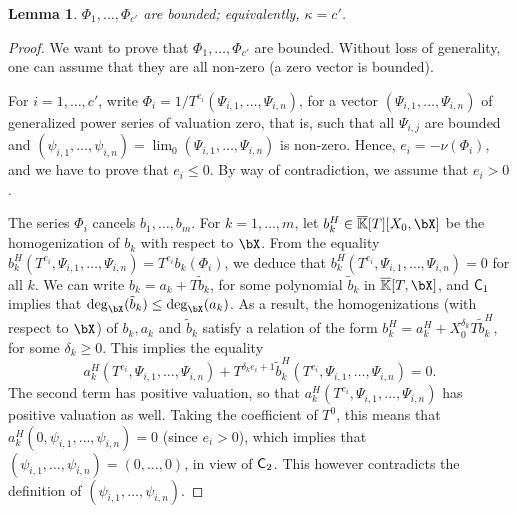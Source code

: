 \documentclass[12pt]{article}
\newtheorem{lemma}[definition]{Lemma}
\begin{document}
\begin{lemma}
   $\Phi_1,\dots,\Phi_{c'}$ are bounded; equivalently, $\kappa=c'$.
\end{lemma}
\begin{proof}
  We want to prove that $\Phi_1,\dots,\Phi_{c'}$ are bounded. Without
  loss of generality, one can assume that they are all non-zero (a
  zero vector is bounded).

  For $i=1,\dots,c'$, write
  $\Phi_i=1/T^{e_i} (\Psi_{i,1},\dots,\Psi_{i,n})$, for a vector
  $(\Psi_{i,1},\dots,\Psi_{i,n})$ of generalized power  series of valuation zero,
  that is, such that all $\Psi_{i,j}$ are bounded and
  $(\psi_{i,1},\dots,\psi_{i,n})=\lim_0(\Psi_{i,1},\dots,\Psi_{i,n})$
  is non-zero. Hence, $e_i=-\nu(\Phi_i)$, and we have to prove that
  $e_i \le 0$.  By way of contradiction, we assume that $e_i > 0$.

  The series $\Phi_i$ cancels $b_1,\dots,b_m$. For $k=1,\dots,m$, let
  $b_k^H \in \KKbar[T][X_0,\bX]$ be the homogenization of $b_k$ with
  respect to $\bX$. From the equality
  $b_k^H(T^{e_i},\Psi_{i,1},\dots,\Psi_{i,n})= T^{e_i}b_k(\Phi_i)$, we
  deduce that $b_k^H(T^{e_i},\Psi_{i,1},\dots,\Psi_{i,n})=0$ for all
  $k$. We can write $b_k = a_{k} + T \tilde b_k$, for some
  polynomial $\tilde b_k$ in $\KKbar[T,\bX]$, and $\mathsf{C}_1$ implies
  that $\deg_\bX(\tilde b_k) \le \deg_\bX(a_{k})$. As a result, the
  homogenizations (with respect to $\bX$) of $b_{k},a_{k}$ and
  $\tilde b_k$ satisfy a relation of the form
  $b^H_k = a_{k}^H + X_0^{\delta_k} T \tilde b^H_k$, for some
  $\delta_k \ge 0$. This implies the equality
  $$a_{k}^H(T^{e_i},\Psi_{i,1},\dots,\Psi_{i,n}) + T^{\delta_k
    e_i+1}\tilde b_k^H(T^{e_i},\Psi_{i,1},\dots,\Psi_{i,n})=0.$$ The
  second term has positive valuation, so that
  $a_{k}^H(T^{e_i},\Psi_{i,1},\dots,\Psi_{i,n})$ has positive
  valuation as well. Taking the coefficient of $T^0$, this means that
  $a_{k}^H(0,\psi_{i,1},\dots,\psi_{i,n})=0$ (since $e_i > 0$),
  which implies that $(\psi_{i,1},\dots,\psi_{i,n})=(0,\dots,0)$, in
  view of $\mathsf{C}_2$.  This however contradicts the definition of
  $(\psi_{i,1},\dots,\psi_{i,n})$.
\end{proof}
\end{document}
